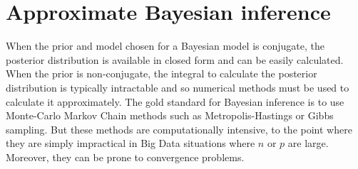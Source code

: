 






\section{Approximate Bayesian inference}
When the prior and model chosen for a Bayesian model is conjugate, the posterior distribution is available in
closed form and can be easily calculated.
When the prior is non-conjugate, the integral to calculate the posterior distribution is typically intractable
and so numerical methods must be used to calculate it approximately.
The gold standard for Bayesian inference is to use Monte-Carlo Markov Chain methods such as Metropolis-Hastings
or Gibbs sampling. But these methods are computationally intensive, to the point where they are simply
impractical in Big Data situations where $n$ or $p$ are large. Moreover, they can be prone to convergence 
problems.

